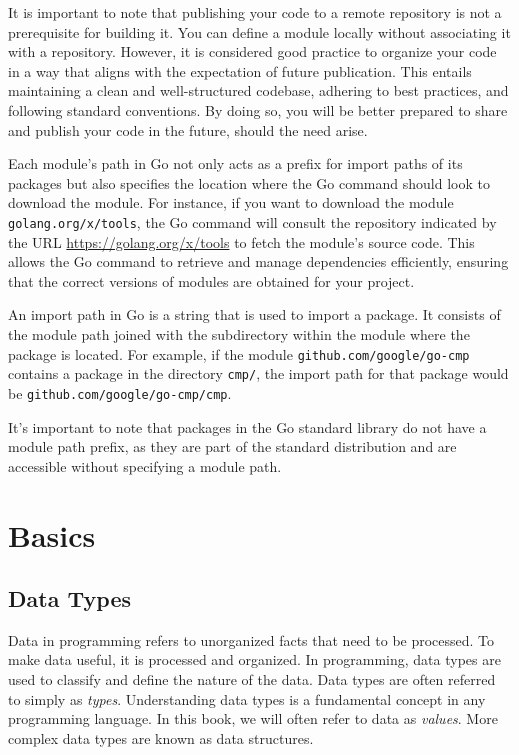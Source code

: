 It is important to note that publishing your code to a remote repository is not
a prerequisite for building it. You can define a module locally without
associating it with a repository. However, it is considered good practice to
organize your code in a way that aligns with the expectation of future
publication. This entails maintaining a clean and well-structured codebase,
adhering to best practices, and following standard conventions. By doing so, you
will be better prepared to share and publish your code in the future, should the
need arise.

Each module's path in Go not only acts as a prefix for import paths of its
packages but also specifies the location where the Go command should look to
download the module. For instance, if you want to download the module
\texttt{golang.org/x/tools}, the Go command will consult the repository indicated by
the URL \url{https://golang.org/x/tools} to fetch the module's source code. This
allows the Go command to retrieve and manage dependencies efficiently, ensuring
that the correct versions of modules are obtained for your project.

An import path in Go is a string that is used to import a package. It consists
of the module path joined with the subdirectory within the module where the
package is located. For example, if the module \texttt{github.com/google/go-cmp}
contains a package in the directory \texttt{cmp/}, the import path for that
package would be \texttt{github.com/google/go-cmp/cmp}.

It's important to note that packages in the Go standard library do not have a
module path prefix, as they are part of the standard distribution and are
accessible without specifying a module path.

\section{Basics}

\subsection{Data Types}

Data in programming refers to unorganized facts that need
to be processed. To make data useful, it is processed and organized. In
programming, data types are used to classify and define the nature of the data.
Data types are often referred to simply as \textit{types}. Understanding data
types is a fundamental concept in any programming language. In this book, we
will often refer to data as \textit{values}. More complex data types are known
as data structures.

